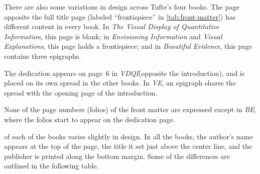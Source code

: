 \documentclass[a4paper]{tufte-book}
\newcommand{\vdqi}{\textit{VDQI}\xspace}
\newcommand{\ve}{\textit{VE}\xspace}
\newcommand{\be}{\textit{BE}\xspace}
\newcommand{\VDQI}{\textit{The Visual Display of Quantitative Information}\xspace}
\newcommand{\EI}{\textit{Envisioning Information}\xspace}
\newcommand{\VE}{\textit{Visual Explanations}\xspace}
\newcommand{\BE}{\textit{Beautiful Evidence}\xspace}
\begin{document}
There are also some variations in design across Tufte's four books. 
The page opposite the full title page (labeled ``frontispiece'' in \cref{tab:front-matter}) has different content in every book. 
In \VDQI, this page is blank;
in \EI and \VE, this page holds a frontispiece;
and in \BE, this page contains three epigraphs.

The dedication appears on page~6 in \vdqi (opposite the introduction), and is placed on its own spread in the other books.
In \ve, an epigraph shares the spread with the opening page of the introduction.

None of the page numbers (folios) of the front matter are expressed except in \be, where the folios start to appear on the dedication page.

 of each of the books varies slightly in design. 
In all the books, the author's name appears at the top of the page, the title it set just above the center line, and the publisher is printed along the bottom margin.
Some of the differences are outlined in the following table.
\end{document}
